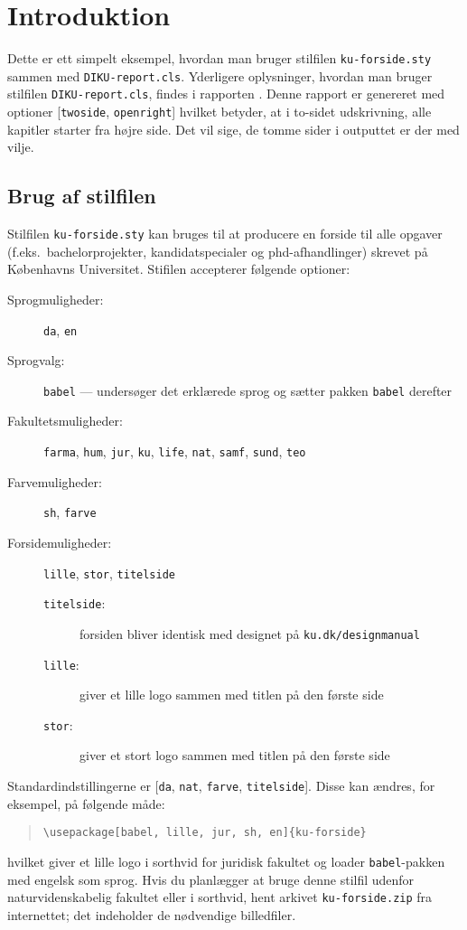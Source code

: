 \chapter*{Introduktion}
%

Dette er ett simpelt eksempel, hvordan man bruger stilfilen
\verb|ku-forside.sty| sammen med \verb|DIKU-report.cls|.  Yderligere
oplysninger, hvordan man bruger stilfilen \verb|DIKU-report.cls|,
findes i rapporten \cite{KR14}. Denne rapport er genereret med
optioner [\verb|twoside|, \verb|openright|] hvilket betyder, at i
to-sidet udskrivning, alle kapitler starter fra højre side. Det vil
sige, de tomme sider i outputtet er der med vilje.

\section*{Brug af stilfilen}

Stilfilen \verb|ku-forside.sty| kan bruges til at producere en forside
til alle opgaver (f.eks.~bachelorprojekter, kandidatspecialer og
phd-afhandlinger) skrevet på Københavns Universitet.  Stifilen
accepterer følgende optioner:
\begin{description}
\item[Sprogmuligheder:]  \texttt{da}, \texttt{en}
\item[Sprogvalg:] \verb|babel| --- undersøger det erklærede sprog og sætter pakken \verb|babel| derefter
\item[Fakultetsmuligheder:] \verb|farma|, \verb|hum|, \verb|jur|, \verb|ku|, \verb|life|, \verb|nat|, \verb|samf|, \verb|sund|, \verb|teo|
\item[Farvemuligheder:] \verb|sh|,  \verb|farve|
\item[Forsidemuligheder:] \verb|lille|, \verb|stor|, \verb|titelside|
\begin{description}
\item[\texttt{titelside}:] forsiden bliver identisk med designet på
  \texttt{ku.dk/designmanual}
\item[\texttt{lille}:] giver et lille logo sammen med titlen på den første side
\item[\texttt{stor}:] giver et stort logo sammen med titlen på den første side
\end{description}
\end{description}

Standardindstillingerne er [\verb|da|, \verb|nat|, \verb|farve|,
  \verb|titelside|].  Disse kan ændres, for eksempel, på følgende
måde:
\begin{quotation}
\verb|\usepackage[babel, lille, jur, sh, en]{ku-forside}|
\end{quotation}
hvilket giver et lille logo i sorthvid for juridisk fakultet og loader
\verb|babel|-pakken med engelsk som sprog.  Hvis du planlægger at bruge denne
stilfil udenfor naturvidenskabelig fakultet eller i sorthvid, hent
arkivet \verb|ku-forside.zip| fra internettet; det indeholder de
nødvendige billedfiler.


